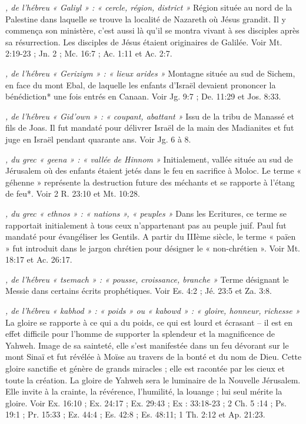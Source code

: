 \begin{multicols}{2}
{\textit{, de l'hébreu « Galiyl » : « cercle, région, district »}\newline
Région située au nord de la Palestine dans laquelle se trouve la localité de Nazareth où Jésus grandit. Il y commença son ministère, c'est aussi là qu'il se montra vivant à ses disciples après sa résurrection. Les disciples de Jésus étaient originaires de Galilée. Voir Mt. 2:19-23 ; Jn. 2 ; Mc. 16:7 ; Ac. 1:11 et Ac. 2:7.

\textit{, de l'hébreu « Geriziym » : « lieux arides »}\newline
Montagne située au sud de Sichem, en face du mont Ebal, de laquelle les enfants d'Israël devaient prononcer la bénédiction* une fois entrés en Canaan. Voir Jg. 9:7 ; De. 11:29 et Jos. 8:33.

\textit{, de l'hébreu « Gid'own » : « coupant, abattant »}\newline
Issu de la tribu de Manassé et fils de Joas. Il fut mandaté pour délivrer Israël de la main des Madianites et fut juge en Israël pendant quarante ans. Voir Jg. 6 à 8.

\textit{, du grec « geena » : « vallée de Hinnom »}\newline
Initialement, vallée située au sud de Jérusalem où des enfants étaient jetés dans le feu en sacrifice à Moloc. Le terme « géhenne » représente la destruction future des méchants et se rapporte à l'étang de feu*. Voir 2 R. 23:10 et Mt. 10:28.

\textit{, du grec « ethnos » : « nations », « peuples »}\newline
Dans les Ecritures, ce terme se rapportait initialement à tous ceux n'appartenant pas au peuple juif. Paul fut mandaté pour évangéliser les Gentils. A partir du IIIème siècle, le terme « païen » fut introduit dans le jargon chrétien pour désigner le « non-chrétien ». Voir Mt. 18:17 et Ac. 26:17.

\textit{, de l'hébreu « tsemach » : « pousse, croissance, branche »}\newline
Terme désignant le Messie dans certains écrits prophétiques. Voir Es. 4:2 ; Jé. 23:5 et Za. 3:8.

\textit{, de l'hébreu « kabhod » : « poids » ou « kabowd » : « gloire, honneur, richesse »}\newline
La gloire se rapporte à ce qui a du poids, ce qui est lourd et écrasant – il est en effet difficile pour l'homme de supporter la splendeur et la magnificence de Yahweh. Image de sa sainteté, elle s'est manifestée dans un feu dévorant sur le mont Sinaï et fut révélée à Moïse au travers de la bonté et du nom de Dieu. Cette gloire sanctifie et génère de grands miracles ; elle est racontée par les cieux et toute la création. La gloire de Yahweh sera le luminaire de la Nouvelle Jérusalem. Elle invite à la crainte, la révérence, l'humilité, la louange ; lui seul mérite la gloire. Voir Ex. 16:10 ; Ex. 24:17 ; Ex. 29:43 ; Ex : 33:18-23 ; 2 Ch. 5 :14 ; Ps. 19:1 ; Pr. 15:33 ; Ez. 44:4 ; Es. 42:8 ; Es. 48:11; 1 Th. 2:12 et Ap. 21:23.

}
\end{multicols}
